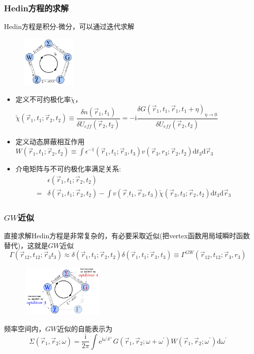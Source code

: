 \documentclass[cjk,slidestop,compress,mathserif,blue]{beamer}
\begin{document}
\frame
{
	\frametitle{\textrm{Hedin}方程的求解} 
	\textrm{Hedin}方程是积分-微分，可以通过迭代求解
\begin{figure}[h!]
\centering
\vspace{-10pt}
\includegraphics[height=1.0in,width=1.05in,viewport=5 5 330 335,clip]{Figures/GW-1.png}
\label{GW-1}
\end{figure}
	\begin{itemize}
			\vspace{-15pt}
		\item 定义不可约极化率$\tilde\chi$，$\tilde\chi(\vec r_1,t_1;\vec r_2,t_2)\equiv\dfrac{\delta n(\vec r_1,t_1)}{\delta U_{e\!f\!f}(\vec r_2,t_2)}=-\mathrm{i}\dfrac{\delta G(\vec r_1,t_1,\vec r_1,t_1+\eta)_{\eta\rightarrow0}}{\delta U_{e\!f\!f}(\vec r_2,t_2)}$
		\item 定义动态屏蔽相互作用$W(\vec r_1,t_1;\vec r_2,t_2)\equiv\int\epsilon^{-1}(\vec r_1,t_1;\vec r_3,t_3)v(\vec r_3,r_3;\vec r_2,t_2)\mathrm{d}t_3\mathrm{d}\vec r_3$
		\item 介电矩阵与不可约极化率满足关系:
			\begin{displaymath}
				\begin{aligned}
					&\epsilon(\vec r_1,t_1;\vec r_2,t_2)\\
					=&\delta(\vec r_1,t_1;\vec r_2,t_2)-\int v(\vec r_,t_1,\vec r_3,t_3)\tilde\chi(\vec r_3,t_3;\vec r_2,t_2)\mathrm{d}t_3\mathrm{d}\vec r_3
				\end{aligned}
			\end{displaymath}
	\end{itemize}

}

\frame
{
	\frametitle{$GW$近似}
	直接求解\textrm{Hedin}方程是非常复杂的，有必要采取近似(把\textrm{vertex}函数用局域瞬时函数替代)，这就是$GW$近似
	$$\Gamma(\vec r_{12},t_{12};\vec r_3t_3)\approx\delta(\vec r_1,t_1;\vec r_2,t_2)\delta(\vec r_1,t_1;\vec r_3,t_3)\equiv\Gamma^{GW}(\vec r_{12},t_{12};\vec r_3,r_3)$$
\begin{figure}[h!]
\centering
\vspace{-15pt}
\includegraphics[height=1.0in,width=1.65in,viewport=5 5 530 320,clip]{Figures/GW-3.png}
\label{GW-2}
\end{figure}
频率空间内，$GW$近似的自能表示为
$$\Sigma(\vec r_1,\vec r_2;\omega)=\dfrac{\mathrm i}{2\pi}\int \mathrm e^{\mathrm i\omega^{\prime}\delta^+}G(\vec r_1,\vec r_2;\omega+\omega^{\prime})W(\vec r_1,\vec r_2;\omega^{\prime})\mathrm{d}\omega^{\prime}$$
}
\end{document}
